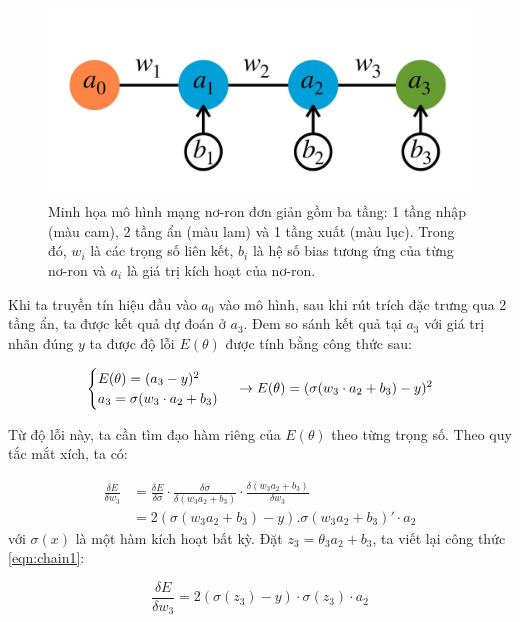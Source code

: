 \begin{figure}[htp]
\centering
\includegraphics[width=120 mm]{images/wandb.jpg}
\caption{Minh họa mô hình mạng nơ-ron đơn giản gồm ba tầng: 1 tầng nhập (màu cam), 2 tầng ẩn (màu lam) và 1 tầng xuất (màu lục). Trong đó, $w_i$ là các trọng số liên kết, $b_i$ là hệ số bias tương ứng của từng nơ-ron và $a_i$ là giá trị kích hoạt của nơ-ron.}
\label{fig:wandb}
\end{figure}

Khi ta truyền tín hiệu đầu vào $a_0$ vào mô hình, sau khi rút trích đặc trưng qua 2 tầng ẩn, ta được kết quả dự đoán ở $a_3$. Đem so sánh kết quả tại $a_3$ với giá trị nhãn đúng $y$ ta được độ lỗi $E(\theta)$ được tính bằng công thức sau:

\begin{equation}
\begin{cases} E(\theta) = (a_3 - y)^2 \\ a_3 = \sigma(w_3\cdot a_2 + b_3) \end{cases} \\
\rightarrow E(\theta) = (\sigma(w_3\cdot a_2 + b_3) - y)^2
\end{equation}

Từ độ lỗi này, ta cần tìm đạo hàm riêng của $E(\theta)$ theo từng trọng số. Theo quy tắc mắt xích, ta có:

\begin{equation} \label{eqn:chain1}
\begin{split}
\frac{\delta E}{\delta w_3} &= \frac{\delta E}{\delta \sigma}\cdot\frac{\delta \sigma}{\delta (w_3a_2 + b_3)}\cdot \frac{\delta(w_3a_2 + b_3)}{\delta w_3} \\ &= 2(\sigma(w_3a_2+b_3)-y). \sigma(w_3a_2 + b_3)'\cdot a_2
\end{split}
\end{equation}
với $\sigma(x)$ là một hàm kích hoạt bất kỳ. Đặt $z_3 = \theta_3a_2 + b_3$, ta viết lại công thức \ref{eqn:chain1}:

\begin{equation} \label{eqn:chain2}
\frac{\delta E}{\delta w_3} = 2(\sigma(z_3)-y)\cdot \sigma(z_3)\cdot a_2
\end{equation}

